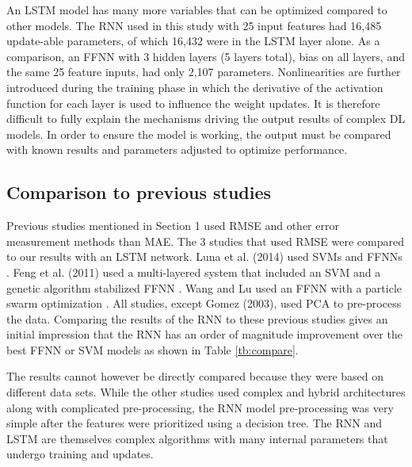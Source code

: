 An LSTM model has many more variables that can be optimized compared to other models. The RNN used in this study with 25 input features had 16,485 update-able parameters, of which 16,432 were in the LSTM layer alone. As a comparison, an FFNN with 3 hidden layers (5 layers total), bias on all layers, and the same 25 feature inputs, had only 2,107 parameters. Nonlinearities are further introduced during the training phase in which the derivative of the activation function for each layer is used to influence the weight updates. It is therefore difficult to fully explain the mechanisms driving the output results of complex DL models. In order to ensure the model is working, the output must be compared with known results and parameters adjusted to optimize performance.

\subsection{Comparison to previous studies}
Previous studies mentioned in Section 1 used RMSE and other error measurement methods than MAE. The 3 studies that used RMSE were compared to our results with an LSTM network. Luna et al. (2014) used SVMs and FFNNs \citep{Luna2014}. Feng et al. (2011) used a multi-layered system that included an SVM and a genetic algorithm stabilized FFNN \citep{Feng2011}. Wang and Lu used an FFNN with a particle swarm optimization \citep{Wang2006}. All studies, except Gomez (2003), used PCA to pre-process the data. Comparing the results of the RNN to these previous studies gives an initial impression that the RNN has an order of magnitude improvement over the best FFNN or SVM models as shown in Table \ref{tb:compare}.
%

\begin{table}[H]
\centering
\caption{Comparison of LSTM RNN test data results to previously published results.}
\label{tb:compare}
\end{table}
%
The results cannot however be directly compared because they were based on different data sets. While the other studies used complex and hybrid architectures along with complicated pre-processing, the RNN model pre-processing was very simple after the features were prioritized using a decision tree. The RNN and LSTM are themselves complex algorithms with many internal parameters that undergo training and updates.

